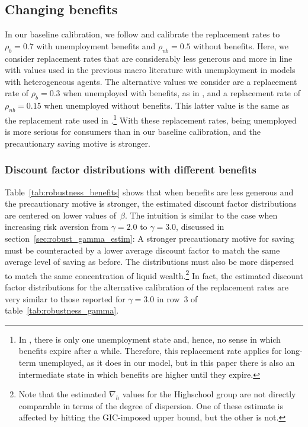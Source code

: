 \documentclass[\econtexRoot/HAFiscal]{subfiles}
\begin{document}
\hypertarget{changing-benefits}{}\subsection{Changing benefits} 
\notinsubfile{\label{sec:robust_benefits}} 

In our baseline calibration, we follow \cite{rothstein2017scraping} and calibrate the replacement rates to $\rho_b=0.7$ with unemployment benefits and $\rho_{nb}=0.5$ without benefits. Here, we consider replacement rates that are considerably less generous and more in line with values used in the previous macro literature with unemployment in models with heterogeneous agents. The alternative values we consider are a replacement rate of $\rho_{b}=0.3$ when unemployed with benefits, as in \cite{carroll2020modeling}, and a replacement rate of $\rho_{nb}=0.15$ when unemployed without benefits. This latter value is the same as the replacement rate used in \cite{den2010computational}.\footnote{In \cite{den2010computational}, there is only one unemployment state and, hence, no sense in which benefits expire after a while. Therefore, this replacement rate applies for long-term unemployed, as it does in our model, but in this paper there is also an intermediate state in which benefits are higher until they expire.} With these replacement rates, being unemployed is more serious for consumers than in our baseline calibration, and the precautionary saving motive is stronger. 

\subsubsection{Discount factor distributions with different benefits}
\notinsubfile{\label{sec:robust_benefits_estim}}

Table~\ref{tab:robustness_benefits} shows that when benefits are less generous and the precautionary motive is stronger, the estimated discount factor distributions are centered on lower values of~$\beta$. The intuition is similar to the case when increasing risk aversion from $\gamma=2.0$ to $\gamma=3.0$, discussed in section~\ref{sec:robust_gamma_estim}: A stronger precautionary motive for saving must be counteracted by a lower average discount factor to match the same average level of saving as before. The distributions must also be more dispersed to match the same concentration of liquid wealth.\footnote{Note that the estimated $\nabla_h$ values for the Highschool group are not directly comparable in terms of the degree of dispersion. One of these estimate is affected by hitting the GIC-imposed upper bound, but the other is not.} In fact, the estimated discount factor distributions for the alternative calibration of the replacement rates are very similar to those reported for $\gamma=3.0$ in row~3 of table~\ref{tab:robustness_gamma}. 
\end{document}

